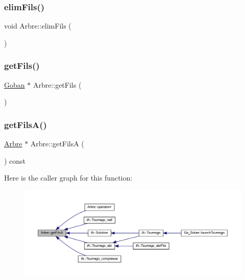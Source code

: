 \mbox{\label{class_arbre_a38451547e67670e3f0828a4d04cef04d}} 
\subsubsection{\texorpdfstring{elim\+Fils()}{elimFils()}}
{\footnotesize\ttfamily void Arbre\+::elim\+Fils (\begin{DoxyParamCaption}{ }\end{DoxyParamCaption})}

\mbox{\label{class_arbre_aeb01ee4f7044ba1107237af784c26a26}} 
\subsubsection{\texorpdfstring{get\+Fils()}{getFils()}}
{\footnotesize\ttfamily \hyperlink{class_goban}{Goban} $\ast$ Arbre\+::get\+Fils (\begin{DoxyParamCaption}{ }\end{DoxyParamCaption})}

\mbox{\label{class_arbre_af2b7629b3686bcf3e49f737adb3b2d24}} 
\subsubsection{\texorpdfstring{get\+Fils\+A()}{getFilsA()}}
{\footnotesize\ttfamily \hyperlink{class_arbre}{Arbre} $\ast$ Arbre\+::get\+FilsA (\begin{DoxyParamCaption}{ }\end{DoxyParamCaption}) const}

Here is the caller graph for this function\+:
\nopagebreak
\begin{figure}[H]
\begin{center}
\leavevmode
\includegraphics[width=350pt]{class_arbre_af2b7629b3686bcf3e49f737adb3b2d24_icgraph}
\end{center}
\end{figure}
\mbox{\label{class_arbre_ae9d294f541cec5e5fac9ccd8fe8496ee}} 
